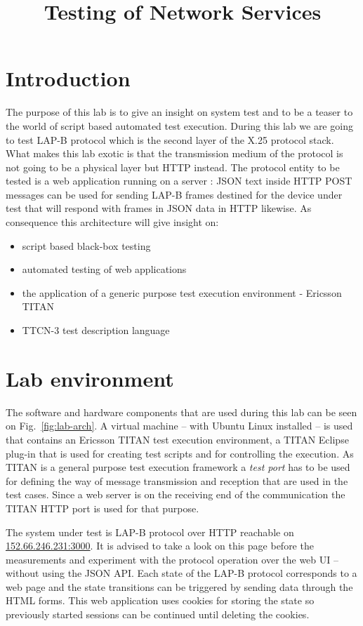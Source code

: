 \documentclass[a4paper]{article}
\title{Testing of Network Services}
\author{}
\date{}
\begin{document}
\maketitle

\tableofcontents

\section{Introduction}

The purpose of this lab is to give an insight on system test and to be a teaser to the world of script based automated
test execution. During this lab we are going to test LAP-B protocol which is the second layer of the X.25 protocol
stack. What makes this lab exotic is that the transmission medium of the protocol is not going to be a physical layer
but HTTP instead. The protocol entity to be tested is a web application running on a server : JSON text inside HTTP
POST messages can be used for sending LAP-B frames destined for the device under test that will respond with frames in
JSON data in HTTP likewise. As consequence this architecture will give insight on:
\begin{itemize}
    \item script based black-box testing
    \item automated testing of web applications
    \item the application of a generic purpose test execution environment - Ericsson TITAN
    \item TTCN-3 test description language
\end{itemize}

\section{Lab environment}

The software and hardware components that are used during this lab can be seen on Fig.~\ref{fig:lab-arch}.
A virtual machine -- with Ubuntu Linux installed -- is used that contains an Ericsson TITAN test execution environment,
a TITAN Eclipse plug-in that is used for creating test scripts and for controlling the execution. As TITAN is a general
purpose test execution framework a \emph{test port} has to be used for defining the way of message transmission and
reception that are used in the test cases. Since a web server is on the receiving end of the communication the TITAN
HTTP port is used for that purpose.

The system under test is LAP-B protocol over HTTP reachable on \url{152.66.246.231:3000}. It is advised to take a look
on this page before the measurements and experiment with the protocol operation over the web UI -- without using the
JSON API.
Each state of the LAP-B protocol corresponds to a web page and the state transitions can be triggered by sending data
through the HTML forms.
This web application uses cookies for storing the state so previously started sessions can be continued until deleting
the cookies.
\end{document}
